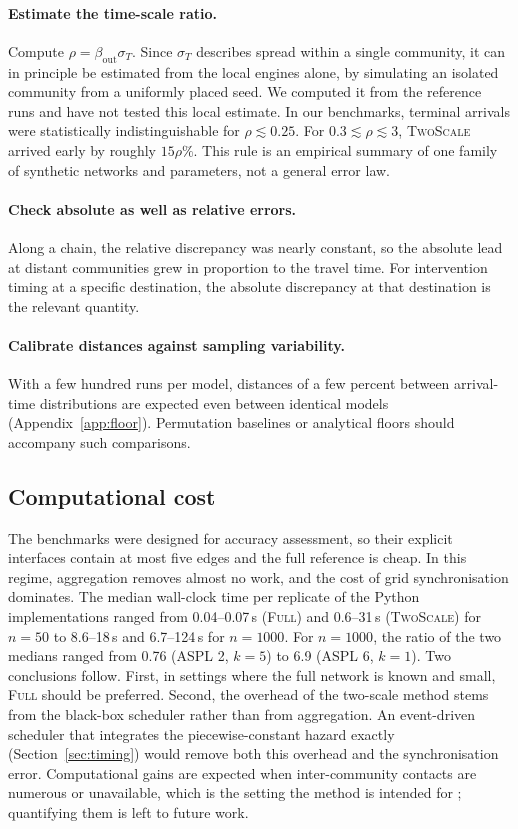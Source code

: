 \documentclass[a4paper,fleqn]{cas-sc}
\newcommand{\Full}{\textup{\textsc{Full}}}
\newcommand{\TS}{\textup{\textsc{TwoScale}}}
\begin{document}
\paragraph{Estimate the time-scale ratio.}
Compute $\rho=\beta_{\mathrm{out}}\sigma_T$. Since $\sigma_T$ describes spread within a single community, it can in principle be estimated from the local engines alone, by simulating an isolated community from a uniformly placed seed. We computed it from the reference runs and have not tested this local estimate. In our benchmarks, terminal arrivals were statistically indistinguishable for $\rho\lesssim0.25$. For $0.3\lesssim\rho\lesssim3$, \TS{} arrived early by roughly $15\rho\%$. This rule is an empirical summary of one family of synthetic networks and parameters, not a general error law.

\paragraph{Check absolute as well as relative errors.}
Along a chain, the relative discrepancy was nearly constant, so the absolute lead at distant communities grew in proportion to the travel time. For intervention timing at a specific destination, the absolute discrepancy at that destination is the relevant quantity.

\paragraph{Calibrate distances against sampling variability.}
With a few hundred runs per model, distances of a few percent between arrival-time distributions are expected even between identical models (Appendix~\ref{app:floor}). Permutation baselines or analytical floors should accompany such comparisons.

\subsection{Computational cost}
\label{sec:disc_cost}

The benchmarks were designed for accuracy assessment, so their explicit interfaces contain at most five edges and the full reference is cheap. In this regime, aggregation removes almost no work, and the cost of grid synchronisation dominates. The median wall-clock time per replicate of the Python implementations ranged from 0.04--0.07\,s (\Full{}) and 0.6--31\,s (\TS{}) for $n=50$ to 8.6--18\,s and 6.7--124\,s for $n=1000$. For $n=1000$, the ratio of the two medians ranged from 0.76 (ASPL 2, $k=5$) to 6.9 (ASPL 6, $k=1$). Two conclusions follow. First, in settings where the full network is known and small, \Full{} should be preferred. Second, the overhead of the two-scale method stems from the black-box scheduler rather than from aggregation. An event-driven scheduler that integrates the piecewise-constant hazard exactly (Section~\ref{sec:timing}) would remove both this overhead and the synchronisation error. Computational gains are expected when inter-community contacts are numerous or unavailable, which is the setting the method is intended for \citep{kuryliak2025towards}; quantifying them is left to future work.
\end{document}
